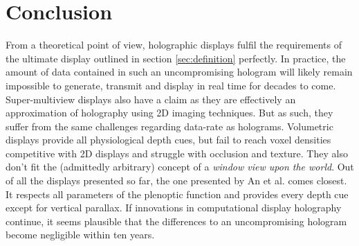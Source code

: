 \section{Conclusion}

From a theoretical point of view, holographic displays fulfil the requirements of the ultimate display outlined in section \ref{sec:definition} perfectly. In practice, the amount of data contained in such an uncompromising hologram will likely remain impossible to generate, transmit and display in real time for decades to come. Super-multiview displays also have a claim as they are effectively an approximation of holography using 2D imaging techniques. But as such, they suffer from the same challenges regarding data-rate as holograms. Volumetric displays provide all physiological depth cues, but fail to reach voxel densities competitive with 2D displays and struggle with occlusion and texture. They also don't fit the (admittedly arbitrary) concept of a \textit{window view upon the world}. Out of all the displays presented so far, the one presented by An et al. \cite{An_Won_Kim_Hong_Kim_Kim_Song_Choi_Kim_Seo_2020} comes closest. It respects all parameters of the plenoptic function and provides every depth cue except for vertical parallax. If innovations in computational display holography continue, it seems plausible that the differences to an uncompromising hologram become negligible within ten years.